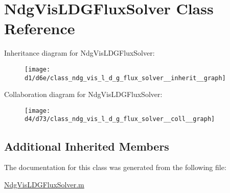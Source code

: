 \hypertarget{class_ndg_vis_l_d_g_flux_solver}{}\section{Ndg\+Vis\+L\+D\+G\+Flux\+Solver Class Reference}
\label{class_ndg_vis_l_d_g_flux_solver}


Inheritance diagram for Ndg\+Vis\+L\+D\+G\+Flux\+Solver\+:
\nopagebreak
\begin{figure}[H]
\begin{center}
\leavevmode
\texttt{[image: d1/d6e/class\_ndg\_vis\_l\_d\_g\_flux\_solver\_\_inherit\_\_graph]}
\end{center}
\end{figure}


Collaboration diagram for Ndg\+Vis\+L\+D\+G\+Flux\+Solver\+:
\nopagebreak
\begin{figure}[H]
\begin{center}
\leavevmode
\texttt{[image: d4/d73/class\_ndg\_vis\_l\_d\_g\_flux\_solver\_\_coll\_\_graph]}
\end{center}
\end{figure}
\subsection*{Additional Inherited Members}


The documentation for this class was generated from the following file\+:\begin{DoxyCompactItemize}
\item 
\hyperlink{_ndg_vis_l_d_g_flux_solver_8m}{Ndg\+Vis\+L\+D\+G\+Flux\+Solver.\+m}\end{DoxyCompactItemize}

